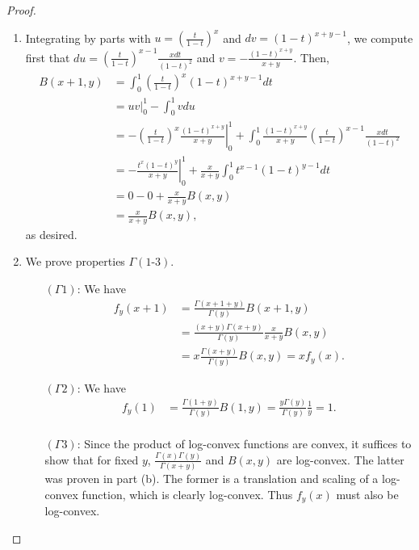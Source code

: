 \documentclass[12pt]{article}
\theoremstyle{remark}
\theoremstyle{named}
\newcommand{\g}{\Gamma}
\begin{document}
\begin{proof}
\begin{enumerate}
        \item Integrating by parts with \(u = \left(\frac{t}{1 - t}\right)^x\) and \(dv = (1 - t)^{x + y - 1}\), we compute first that \(du = \left(\frac{t}{1 - t}\right)^{x - 1}\frac{x dt}{(1 - t)^2}\) and \(v = -\frac{(1 - t)^{x + y}}{x + y}\). Then,
        \begin{align*}
            B(x + 1, y) &= \int_{0}^{1} \left(\frac{t}{1 - t}\right)^x ( 1- t)^{x + y - 1} dt \\
            &= \left . uv \right |_0^1 - \int_{0}^{1}v du \\
            &= \left . -\left(\frac{t}{1 - t}\right)^x \frac{(1 - t)^{x + y}}{x + y}  \right |_0^1 + \int_{0}^{1} \frac{(1 - t)^{x + y}}{x + y} \left(\frac{t}{1 - t}\right)^{x - 1}\frac{x dt}{(1 - t)^2} \\
            &= \left . - \frac{t^x(1 - t)^{y}}{x + y}  \right |_0^1 + \frac{x}{x + y}\int_{0}^{1} t^{x - 1}(1 - t)^{y - 1} dt \\
            &= 0 - 0 + \frac{x}{x + y} B(x, y) \\
            &= \frac{x}{x + y} B(x, y),
        \end{align*}
        as desired.
        \item We prove properties \(\g(\text{1-3})\).
        \begin{enumerate}
            \item[\((\g1)\):] We have 
            \begin{align*}
                f_y(x + 1) &= \frac{\g(x + 1 + y)}{\g(y)} B(x + 1, y) \\
                &= \frac{(x + y)\g(x + y)}{\g(y)} \frac{x}{x + y} B(x, y) \\
                &= x \frac{\g(x + y)}{\g(y)} B(x, y) = x f_y(x).
            \end{align*}
            \item[\((\g2)\):] We have 
            \begin{align*}
                f_y(1) &= \frac{\g(1 + y)}{\g(y)} B(1, y) = \frac{y \g(y)}{\g(y)}\frac{1}{y} = 1. \\
            \end{align*}
            \item[\((\g3)\):] Since the product of log-convex functions are convex, it suffices to show that for fixed \(y\), \(\frac{\g(x)\g(y)}{\g(x + y)}\) and \(B(x, y)\) are log-convex. The latter was proven in part (b). The former is a translation and scaling of a log-convex function, which is clearly log-convex. Thus \(f_y(x)\) must also be log-convex.

\end{enumerate}
\end{enumerate}
\end{proof}
\end{document}
